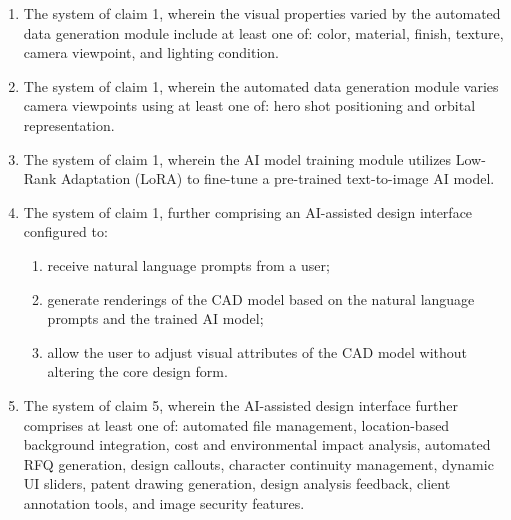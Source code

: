 \documentclass[12pt]{report}
\begin{document}
\begin{center}
\begin{enumerate}
    \item The system of claim 1, wherein the visual properties varied by the automated data generation module include at least one of: color, material, finish, texture, camera viewpoint, and lighting condition.
    
    \item The system of claim 1, wherein the automated data generation module varies camera viewpoints using at least one of: hero shot positioning and orbital representation.
    
    \item The system of claim 1, wherein the AI model training module utilizes Low-Rank Adaptation (LoRA) to fine-tune a pre-trained text-to-image AI model.
    
    \item The system of claim 1, further comprising an AI-assisted design interface configured to:
        \begin{enumerate}
            \item receive natural language prompts from a user;
            \item generate renderings of the CAD model based on the natural language prompts and the trained AI model;
            \item allow the user to adjust visual attributes of the CAD model without altering the core design form.
        \end{enumerate}
    
    \item The system of claim 5, wherein the AI-assisted design interface further comprises at least one of: automated file management, location-based background integration, cost and environmental impact analysis, automated RFQ generation, design callouts, character continuity management, dynamic UI sliders, patent drawing generation, design analysis feedback, client annotation tools, and image security features.
    

\end{enumerate}
\end{center}
\end{document}
